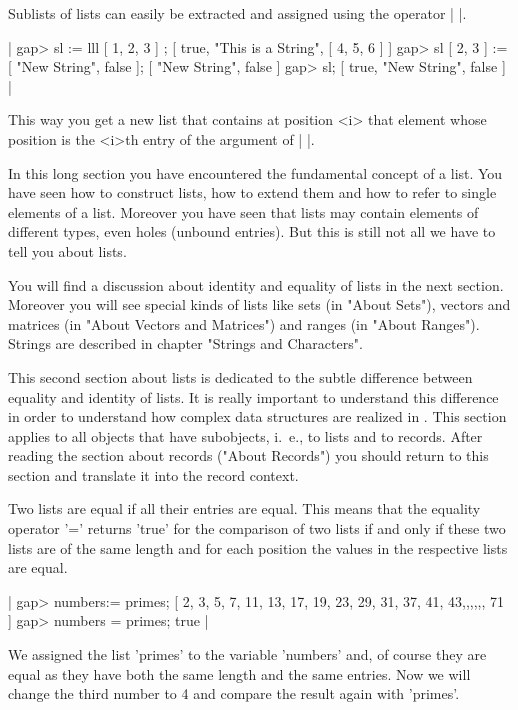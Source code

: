 Sublists of lists can easily be extracted and assigned using the operator
|{ }|.

|    gap> sl := lll{ [ 1, 2, 3 ] };
    [ true, "This is a String", [ 4, 5, 6 ] ]
    gap> sl{ [ 2, 3 ] } := [ "New String", false ];
    [ "New String", false ]
    gap> sl;
    [ true, "New String", false ] |

This way you get a new list that contains at position <i> that element
whose position is the <i>th entry of the argument of |{ }|.

In  this long  section you have  encountered the fundamental concept of a
list.  You have  seen  how to construct lists, how to extend them and how
to refer to single elements of a list.  Moreover you have seen that lists
may  contain elements of different types,  even holes (unbound  entries).
But this is still not all we have to tell you about lists.

You will find a discussion  about identity  and equality of  lists in the
next section.  Moreover you will see special kinds of lists like sets (in
"About Sets"), vectors and matrices (in "About Vectors and Matrices") and
ranges (in  "About Ranges").   Strings are described  in chapter "Strings
and Characters".


This second section  about lists  is dedicated  to the subtle  difference
between equality and  identity of   lists.  It  is really  important   to
understand  this difference  in  order  to  understand  how  complex data
structures  are  realized in {\GAP}.  This section applies  to all {\GAP}
objects  that  have subobjects, i.~e., to  lists  and to records.   After
reading the section about records ("About Records")  you should return to
this section and translate it into the record context.

Two  lists are equal if all their entries are equal.  This means that the
equality operator '=' returns 'true' for the  comparison of  two lists if
and  only if these two lists are of the same length and for each position
the values in the respective lists are equal.

|    gap> numbers:= primes;
    [ 2, 3, 5, 7, 11, 13, 17, 19, 23, 29, 31, 37, 41, 43,,,,,, 71 ]
    gap> numbers = primes;
    true |

We assigned  the  list 'primes' to the variable  'numbers' and, of course
they are equal as they have  both  the same length  and the same entries.
Now we  will change the  third number to  4 and  compare the result again
with 'primes'.

